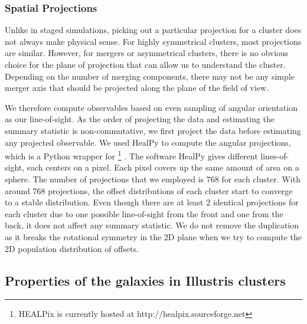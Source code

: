 \subsubsection{Spatial Projections}
\label{subsubsec:projections}
Unlike in staged simulations, picking out a particular projection for a cluster 
does not always make physical sense.
For highly symmetrical clusters, most projections are similar. 
However, for mergers or asymmetrical clusters, 
there is no obvious choice for the plane of projection that can allow us to
understand the cluster. Depending on the number of merging components, there
may not be any simple merger axis that should be 
projected along the plane of the field of view. 

We therefore compute observables based on even sampling of angular orientation 
as our line-of-sight.
As the order of projecting the data and estimating the summary statistic is
non-commutative, we first project the data before estimating any projected 
observable. 
We used {\sc HealPy} to compute the angular projections,
which is a {\sc Python} wrapper for
{} \footnote{HEALPix is
currently hosted at http://healpix.sourceforge.net}
\citep{Gorski2005}. The software {\sc HealPy} gives different
lines-of-sight, each centers on a {} 
pixel. Each pixel covers up the same amount of area on a sphere. 
The number of projections that we employed is 768 for each cluster. With around 
768 projections, the offset distributions of each cluster start to converge to a
stable distribution. 
Even though there are at least 2 identical projections for each cluster due to
one possible line-of-sight from the front and one from the back, it does not
affect any summary statistic. We do not remove the duplication as it breaks
the rotational symmetry in the 2D plane when we try to compute the 2D population
distribution of offsets.  


\subsection{Properties of the galaxies in Illustris clusters}
\label{subsec:galaxy_properties}

